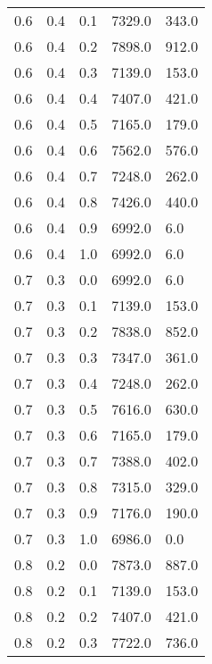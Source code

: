 \begin{longtable}{ l | l | l | l | l}
        0.6&          0.4&          0.1&       7329.0&        343.0\\
        0.6&          0.4&          0.2&       7898.0&        912.0\\
        0.6&          0.4&          0.3&       7139.0&        153.0\\
    0.6&          0.4&          0.4&       7407.0&        421.0\\
    0.6&          0.4&          0.5&       7165.0&        179.0\\
    0.6&          0.4&          0.6&       7562.0&        576.0\\
    0.6&          0.4&          0.7&       7248.0&        262.0\\
    0.6&          0.4&          0.8&       7426.0&        440.0\\
    0.6&          0.4&          0.9&       6992.0&          6.0\\
    0.6&          0.4&          1.0&       6992.0&          6.0\\
    0.7&          0.3&          0.0&       6992.0&          6.0\\
    0.7&          0.3&          0.1&       7139.0&        153.0\\
    0.7&          0.3&          0.2&       7838.0&        852.0\\
    0.7&          0.3&          0.3&       7347.0&        361.0\\
    0.7&          0.3&          0.4&       7248.0&        262.0\\
    0.7&          0.3&          0.5&       7616.0&        630.0\\
    0.7&          0.3&          0.6&       7165.0&        179.0\\
    0.7&          0.3&          0.7&       7388.0&        402.0\\
    0.7&          0.3&          0.8&       7315.0&        329.0\\
    0.7&          0.3&          0.9&       7176.0&        190.0\\
    0.7&          0.3&          1.0&       6986.0&          0.0\\
    0.8&          0.2&          0.0&       7873.0&        887.0\\
    0.8&          0.2&          0.1&       7139.0&        153.0\\
    0.8&          0.2&          0.2&       7407.0&        421.0\\
    0.8&          0.2&          0.3&       7722.0&        736.0\\

\end{longtable}
